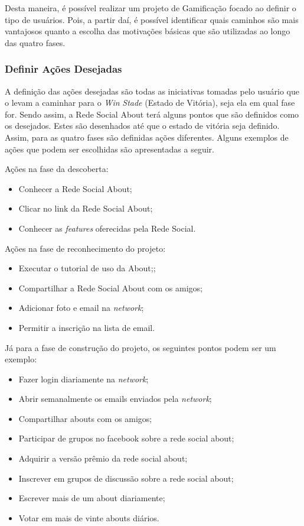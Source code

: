 Desta maneira, é possível realizar um projeto de Gamificação focado ao definir o tipo
de usuários. Pois, a partir daí, é possível identificar quais caminhos são mais vantajosos
quanto a escolha das motivações básicas que são utilizadas ao longo das quatro fases.

\subsubsection{Definir Ações Desejadas}
\label{sub:define_desired_actions}
A definição das ações desejadas são todas as iniciativas tomadas pelo usuário que o levam a caminhar para
o \textit{Win} \textit{Stade} (Estado de Vitória), seja ela em qual fase for. Sendo assim, a Rede Social
About terá alguns pontos que são definidos como os desejados. Estes são desenhados
até que o estado de vitória seja definido. Assim, para as quatro fases são definidas
ações diferentes. Alguns exemplos de ações que podem ser escolhidas são apresentadas
a seguir.

Ações na fase da descoberta:
\begin{itemize}
    \item Conhecer a Rede Social About;
    \item Clicar no link da Rede Social About;
    \item Conhecer as \textit{features} oferecidas pela Rede Social.
\end{itemize}


Ações na fase de reconhecimento do projeto:
\begin{itemize}
    \item Executar o tutorial de uso da About;;
    \item Compartilhar a Rede Social About com os amigos;
    \item Adicionar foto e email na \textit{network};
    \item Permitir a inscrição na lista de email.
\end{itemize}

Já para a fase de construção do projeto, os seguintes pontos podem ser um
exemplo:

\begin{itemize}
    \item Fazer login diariamente na \textit{network};
    \item Abrir semanalmente os emails enviados pela \textit{network};
    \item Compartilhar abouts com os amigos;
    \item Participar de grupos no facebook sobre a rede social about;
    \item Adquirir a versão prêmio da rede social about;
    \item Inscrever em grupos de discussão sobre a rede social about;
    \item Escrever mais de um about diariamente;
    \item Votar em mais de vinte abouts diários.
\end{itemize}

